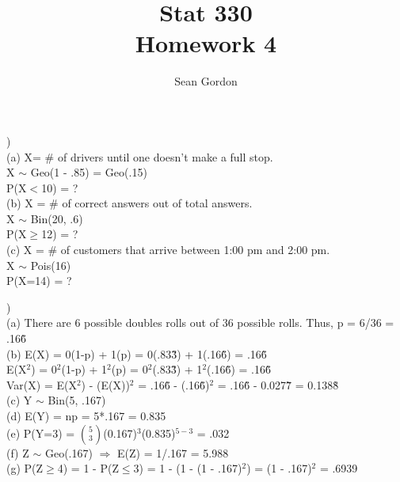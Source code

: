 \documentclass[12pt]{article}
\title{Stat 330\\Homework 4}
\author{Sean Gordon}
\begin{document}
\maketitle


\noindent\hrulefill 


)\\
\indent (a) X= \# of drivers until one doesn't make a full stop.\\
\indent \indent X $\sim$ Geo(1 - .85) = Geo(.15)\\
\indent \indent P(X$<$10) = ?\\

\indent (b) X = \# of correct answers out of total answers.\\
\indent \indent X $\sim$ Bin(20, .6)\\
\indent \indent P(X$\ge$12) = ?\\

\indent (c) X = \# of customers that arrive between 1:00 pm and 2:00 pm.\\
\indent \indent X $\sim$ Pois(16)\\
\indent \indent P(X=14) = ?\\[-.8em]


\noindent \hrulefill 

)\\
\indent (a) There are 6 possible doubles rolls out of 36 possible rolls. Thus, p = 6/36 = .16\~6\\

\indent (b) E(X) = 0(1-p) + 1(p) = 0(.83\~3) + 1(.16\~6) = .16\~6\\
\indent \indent E(X$^2$) = 0$^2$(1-p) + 1$^2$(p) = 0$^2$(.83\~3) + 1$^2$(.16\~6) = .16\~6\\
\indent \indent Var(X) = E(X$^2$) - (E(X))$^2$ = .16\~6 - (.16\~6)$^2$ = .16\~6 - 0.027\~7 = 0.138\~8\\

\indent (c) Y $\sim$ Bin(5, .167)\\

\indent (d) E(Y) = np = 5*.167 = 0.835\\

\indent (e) P(Y=3) = {\Large$\binom{5}{3}$}(0.167)$^{3}$(0.835)$^{5-3}$ = .032\\

\indent (f) Z $\sim$ Geo(.167) $\Rightarrow$ E(Z) = 1/.167 = 5.988\\

\indent (g) P(Z$\ge$4) = 1 - P(Z$\le$3) = 1 - (1 - (1 - .167)$^2$) = (1 - .167)$^2$ = .6939\\[-.8em]
\end{document}

